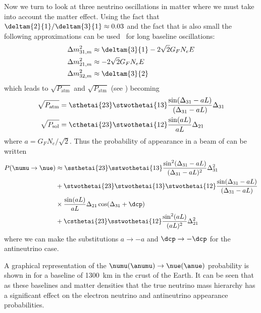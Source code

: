 Now we turn to look at three neutrino oscillations in matter where we must take into account the matter effect.
Using the fact that $\deltam{2}{1}/\deltam{3}{1} \approx 0.03$ and the fact that  is also small the following approximations can be used~\cite{Nunokawa_2008} for long baseline oscillations:
\begin{align}
  \Delta m^{2}_{31, m} &\approx \deltam{3}{1} - 2 \sqrt{2} G_{F} N_{e} E \\
  \Delta m^{2}_{21, m} &\approx - 2 \sqrt{2} G_{F} N_{e} E \\
  \Delta m^{2}_{32, m} &\approx \deltam{3}{2}
\end{align}
which leads to $\sqrt{P_{\text{atm}}}$ and $\sqrt{P_{\text{atm}}}$ (see ) becoming~\cite{Nunokawa_2008}
\begin{align}
  \sqrt{P_{\text{atm}}} &= \sthetai{23} \stwothetai{13} \frac{ \sin(\Delta_{31}-aL) }{ (\Delta_{31} - aL) } \Delta_{31} \\
  \sqrt{P_{\text{sol}}} &= \cthetai{23} \stwothetai{12} \frac{ \sin(aL) }{ aL } \Delta_{21}
\end{align}
where $a = G_{F}N_{e} / \sqrt{2}$.
Thus the probability of \nue appearance in a beam of \numu can be written
\begin{align}
  P(\numu \rightarrow \nue) &\approx \ssthetai{23} \sstwothetai{13} \frac{ \sin^{2}(\Delta_{31}-aL) }{ (\Delta_{31} - aL)^{2} } \Delta_{31}^{2} \\
  &+ \stwothetai{23} \stwothetai{13} \stwothetai{12} \frac{ \sin(\Delta_{31}-aL) }{ (\Delta_{31} - aL) } \\
  & \times \frac{ \sin(aL) }{aL} \Delta_{21} \cos(\Delta_{31} + \dcp) \\
  &+ \csthetai{23}\sstwothetai{12} \frac{ \sin^{2}(aL) }{(aL)^{2}} \Delta_{21}^{2} 
\end{align}
where we can make the substitutions $a \rightarrow -a$ and $\dcp \rightarrow -\dcp$ for the antineutrino case.

A graphical representation of the $\numu(\anumu) \rightarrow \nue(\anue)$ probability is shown in  for a baseline of 1300~km in the crust of the Earth.
It can be seen that as these baselines and matter densities that the true neutrino mass hierarchy has a significant effect on the electron neutrino and antineutrino appearance probabilities.

